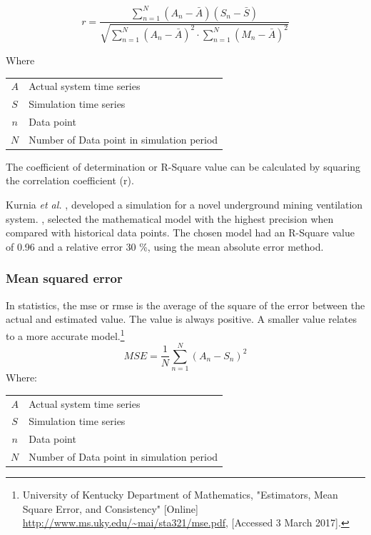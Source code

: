  		\begin{equation}
 		\label{eq: Correlation coefficient}
 		r = \dfrac{\sum_{n=1}^{N}(A_n - \bar{A})(S_n - \bar{S})}{\sqrt{\sum_{n=1}^{N}(A_n - \bar{A})^2 \cdot \sum_{n=1}^{N}(M_n - \bar{A})^2}}
 		\end{equation}
 		\par
 		Where \par
 		\begin{table}[h!]
 			\centering
 			\begin{tabular}{cl}
 				$A$ & Actual system time series \\
 				$S$ & Simulation time series \\
 				$n$ & Data point \\
 				$N$ & Number of Data point in simulation period \\
 			\end{tabular} 
 		\end{table}	
 		The coefficient of determination or R-Square value can be calculated by squaring the correlation coefficient (r). 
 		\par 
 			Kurnia \textit{et al.} \cite{kurnia2014simulation}, \cite{kurnia2014dust} developed a simulation for a novel underground mining ventilation system. \cite{kurnia2014simulation}, \cite{kurnia2014dust} selected the mathematical model with the highest precision when compared with historical data points. The chosen model had an R-Square value of 0.96 and a relative error 30 \%, using the mean absolute error method. 
 			
 		\subsubsection{Mean squared error}	
 		In statistics, the \gls{mse} or \gls{rmse} is the average of the square of the error between the actual and estimated value. The value is always positive. A smaller value relates to a more accurate model.\footnote{University of Kentucky Department of Mathematics, "Estimators, Mean Square Error, and
 			Consistency" [Online] \url{http://www.ms.uky.edu/~mai/sta321/mse.pdf}, [Accessed 3 March 2017].}
 			\begin{equation}
 				\label{eq: rmse}
 				MSE = \dfrac{1}{N}\sum_{n=1}^{N}{(A_{n} - S_{n})^2}
 			\end{equation}
 			Where: \par
 			\begin{table}[h!]
 				\centering
 				\begin{tabular}{cl}
 					$A$ & Actual system time series \\
 					$S$ & Simulation time series \\
 					$n$ & Data point \\
 					$N$ & Number of Data point in simulation period \\
 			\end{tabular} 
 			\end{table}			

